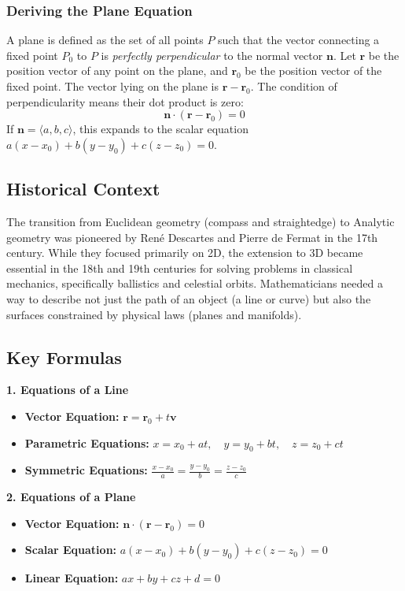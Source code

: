\documentclass[11pt]{article}
\begin{document}
\subsubsection{Deriving the Plane Equation}
A plane is defined as the set of all points $P$ such that the vector connecting a fixed point $P_0$ to $P$ is \textit{perfectly perpendicular} to the normal vector $\mathbf{n}$.
Let $\mathbf{r}$ be the position vector of any point on the plane, and $\mathbf{r}_0$ be the position vector of the fixed point. The vector lying on the plane is $\mathbf{r} - \mathbf{r}_0$.
The condition of perpendicularity means their dot product is zero:
\[ \mathbf{n} \cdot (\mathbf{r} - \mathbf{r}_0) = 0 \]
If $\mathbf{n} = \langle a, b, c \rangle$, this expands to the scalar equation $a(x-x_0) + b(y-y_0) + c(z-z_0) = 0$.

\subsection{Historical Context}
The transition from Euclidean geometry (compass and straightedge) to Analytic geometry was pioneered by René Descartes and Pierre de Fermat in the 17th century. While they focused primarily on 2D, the extension to 3D became essential in the 18th and 19th centuries for solving problems in classical mechanics, specifically ballistics and celestial orbits. Mathematicians needed a way to describe not just the path of an object (a line or curve) but also the surfaces constrained by physical laws (planes and manifolds).

\subsection{Key Formulas}

\textbf{1. Equations of a Line}
\begin{itemize}
    \item \textbf{Vector Equation:} $\mathbf{r} = \mathbf{r}_0 + t\mathbf{v}$
    \item \textbf{Parametric Equations:} $x = x_0 + at, \quad y = y_0 + bt, \quad z = z_0 + ct$
    \item \textbf{Symmetric Equations:} $\frac{x-x_0}{a} = \frac{y-y_0}{b} = \frac{z-z_0}{c}$
\end{itemize}

\textbf{2. Equations of a Plane}
\begin{itemize}
    \item \textbf{Vector Equation:} $\mathbf{n} \cdot (\mathbf{r} - \mathbf{r}_0) = 0$
    \item \textbf{Scalar Equation:} $a(x-x_0) + b(y-y_0) + c(z-z_0) = 0$
    \item \textbf{Linear Equation:} $ax + by + cz + d = 0$
\end{itemize}
\end{document}
